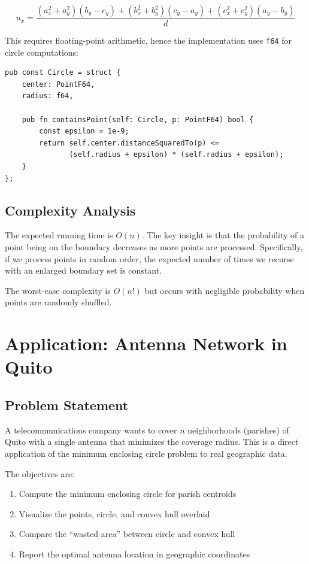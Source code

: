 \documentclass[11pt,a4paper]{article}
\begin{document}
\begin{equation}
    u_x = \frac{(a_x^2 + a_y^2)(b_y - c_y) + (b_x^2 + b_y^2)(c_y - a_y) + (c_x^2 + c_y^2)(a_y - b_y)}{d}
\end{equation}

This requires floating-point arithmetic, hence the implementation uses \texttt{f64} for circle computations:

\begin{lstlisting}[caption={Circumcircle computation}]
pub const Circle = struct {
    center: PointF64,
    radius: f64,

    pub fn containsPoint(self: Circle, p: PointF64) bool {
        const epsilon = 1e-9;
        return self.center.distanceSquaredTo(p) <=
               (self.radius + epsilon) * (self.radius + epsilon);
    }
};
\end{lstlisting}

\subsection{Complexity Analysis}

The expected running time is $O(n)$. The key insight is that the probability of a point being on the boundary decreases as more points are processed. Specifically, if we process points in random order, the expected number of times we recurse with an enlarged boundary set is constant.

The worst-case complexity is $O(n!)$ but occurs with negligible probability when points are randomly shuffled.

\section{Application: Antenna Network in Quito}

\subsection{Problem Statement}

A telecommunications company wants to cover $n$ neighborhoods (parishes) of Quito with a single antenna that minimizes the coverage radius. This is a direct application of the minimum enclosing circle problem to real geographic data.

The objectives are:
\begin{enumerate}
    \item Compute the minimum enclosing circle for parish centroids
    \item Visualize the points, circle, and convex hull overlaid
    \item Compare the ``wasted area'' between circle and convex hull
    \item Report the optimal antenna location in geographic coordinates
\end{enumerate}
\end{document}

